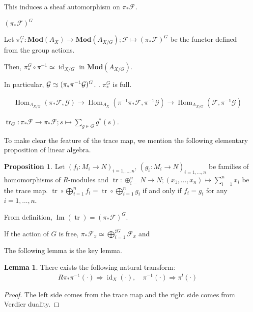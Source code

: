 \documentclass[a4paper,dvipdfmx,reqno,12pt]{amsart}
\theoremstyle{definition}
\newtheorem{Prop}[Thm]{Proposition}
\newtheorem{Lem}[Thm]{Lemma}
\newcommand{\mcal}[1]{\mathcal{#1}}%
\newcommand{\opn}[1]{\operatorname{#1}}
\newcommand{\catn}[1]{\mathbf{#1}}
\newcommand{\simto}{ 
\mathrel{\raisebox{0.13em}{${\sim}$}}
\kern -0.75em \mathrel{\raisebox{-0.11em}{${\scriptstyle \to}$}}  
}
\numberwithin{equation}{section}
\begin{document}
This induces a sheaf automorphism on $\pi_*\mcal{F}$.

$(\pi_*\mcal{F})^{G}$


Let $\pi_{*}^{G}: \catn{Mod}(A_X)\to \catn{Mod}(A_{X/G});
  \mcal{F}\mapsto (\pi_*\mcal{F})^{G}$
be the functor defined from the group actions.

Then, $\pi_*^{G}\circ \pi^{-1}\simeq \opn{id}_{X/G}$
in  $\catn{Mod}(A_{X/G})$.





In particular, $\mcal{G}\simto(\pi_*\pi^{-1}\mcal{G})^{G}$.
\cite[Theorem 19.1]{bredonSheafTheory1997a}.
$\pi_*^{G}$ is full.



\begin{align}
  \opn{Hom}_{A_{X/G}}(\pi_*\mcal{F},\mcal{G})\to
  \opn{Hom}_{A_{X}}(\pi^{-1}\pi_*\mcal{F},\pi^{-1}\mcal{G}) \to
  \opn{Hom}_{A_{X/G}}(\mcal{F},\pi^{-1}\mcal{G})
\end{align}

$\opn{tr}_{G}:\pi_*\mcal{F}\to \pi_*\mcal{F};
  s \mapsto \sum_{g\in G}g^{*}(s)$.

To make clear the feature of the trace map, we mention the
following elementary proposition of linear algebra.

\begin{Prop}
  Let $(f_i:M_i \to N)_{i=1,\ldots,n}$,
  $(g_i:M_i \to N)_{i=1,\ldots,n}$ be families of
  homomorphisms of
  $R$-modules and $\opn{tr}:\oplus_{i=}^{n}N \to N;
    (x_1,\ldots,x_n)\mapsto \sum_{i=1}^{n}x_i$ be the trace map.
  $\opn{tr}\circ \bigoplus_{i=1}^{n} f_i=\opn{tr}\circ \bigoplus_{i=1}^{n}g_i$ if
  and only if $f_i=g_i$ for any $i=1,\ldots,n$.
\end{Prop}


From definition, $\opn{Im}(\opn{tr})=(\pi_*\mcal{F})^{G}$.


If the action of $G$ is free,
$\pi_*\mcal{F}_x\simeq \bigoplus_{i=1}^{\sharp G}\mcal{F}_x$
and



The following lemma is the key lemma.

\begin{Lem}
  There exists the following natural transform:
  \begin{align}
    R\pi_*\pi^{-1}(\cdot)\Rightarrow \opn{id}_X(\cdot),\quad
    \pi^{-1}(\cdot) \Rightarrow \pi^{!}(\cdot)
  \end{align}
\end{Lem}
\begin{proof}
  The left side comes from the trace map and the right side
  comes from Verdier duality.
\end{proof}
\end{document}
